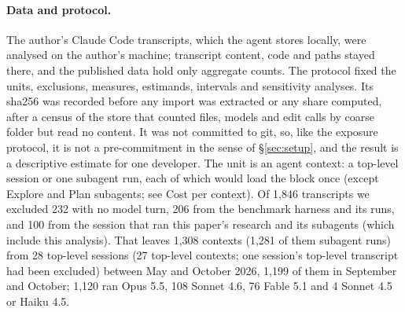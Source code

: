 \documentclass[11pt]{article}
\begin{document}
\paragraph{Data and protocol.}
The author's Claude Code transcripts, which the agent stores locally, were analysed on the author's machine; transcript content, code and paths stayed there, and the published data hold only aggregate counts. The protocol fixed the units, exclusions, measures, estimands, intervals and sensitivity analyses. Its sha256 was recorded before any import was extracted or any share computed, after a census of the store that counted files, models and edit calls by coarse folder but read no content. It was not committed to git, so, like the exposure protocol, it is not a pre-commitment in the sense of \S\ref{sec:setup}, and the result is a descriptive estimate for one developer.
The unit is an agent context: a top-level session or one subagent run, each of which would load the block once (except Explore and Plan subagents; see Cost per context). Of 1,846 transcripts we excluded 232 with no model turn, 206 from the benchmark harness and its runs, and 100 from the session that ran this paper's research and its subagents (which include this analysis). That leaves 1,308 contexts (1,281 of them subagent runs) from 28 top-level sessions (27 top-level contexts; one session's top-level transcript had been excluded) between May and October 2026, 1,199 of them in September and October; 1,120 ran Opus 5.5, 108 Sonnet 4.6, 76 Fable 5.1 and 4 Sonnet 4.5 or Haiku 4.5.
\end{document}
